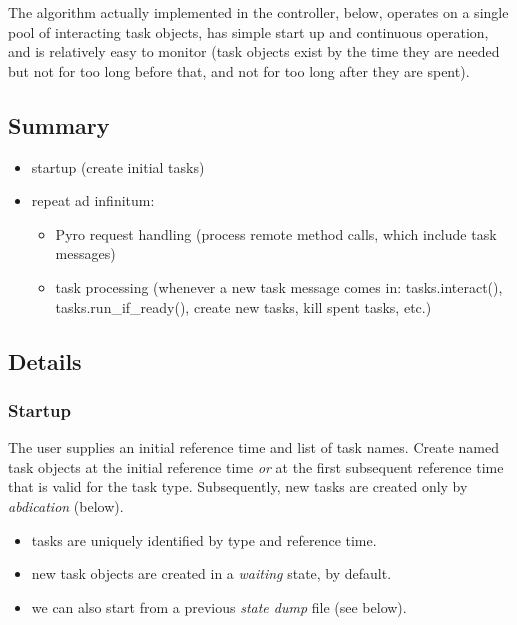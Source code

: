 \documentclass[a4paper,12pt]{amsart}
\begin{document}
The algorithm actually implemented in the controller, below, operates on
a single pool of interacting task objects, has simple start up and
continuous operation, and is relatively easy to monitor (task objects
exist by the time they are needed but not for too long before that, and
not for too long after they are spent). 

\subsection{Summary}

\begin{itemize}
    \item startup (create initial tasks)
    \item repeat ad infinitum:
    \begin{itemize}
        \item Pyro request handling (process remote method calls, which
        include task messages)
        \item task processing (whenever a new task message comes in:
        tasks.interact(), tasks.run\_if\_ready(), create new tasks, kill
        spent tasks, etc.)
    \end{itemize}
\end{itemize}


\subsection{Details}

\subsubsection{Startup}

The user supplies an initial reference time and list of task names.
Create named task objects at the initial reference time {\em or} at the
first subsequent reference time that is valid for the task type.
Subsequently, new tasks are created only by {\em abdication} (below).
    \begin{itemize}
        \item tasks are uniquely identified by type and reference time. 
        \item new task objects are created in a {\em waiting} state, by
        default.
        \item we can also start from a previous {\em state dump} file
        (see below).
    \end{itemize}
\end{document}

